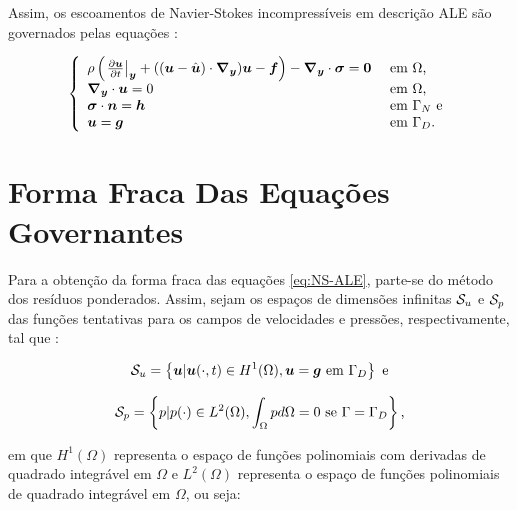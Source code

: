 Assim, os escoamentos de Navier-Stokes incompressíveis em descrição ALE são governados pelas equações \cite{bazilevs2013computational}:

\begin{equation}
    \left\{
    \begin{array}{ll}
        \rho\left({\left.\frac{\partial \boldsymbol{u}}{\partial t}\right|_{\boldsymbol{y}}+((\boldsymbol{u}-\hat{\boldsymbol{u}})\cdot\boldsymbol{\nabla_y})\boldsymbol{u}-\boldsymbol{f}}\right)-\boldsymbol{\nabla_y}\cdot\boldsymbol{\sigma}=\boldsymbol{0} & \text{ em }\Omega\text{,}    \\
        \boldsymbol{\nabla_y}\cdot\boldsymbol{u}=0                                                                         & \text{ em }\Omega\text{,}    \\
        \boldsymbol{\sigma}\cdot\boldsymbol{n}=\boldsymbol{h}                                                                  & \text{ em }\Gamma_N\text{ e} \\
        \boldsymbol{u}=\boldsymbol{g}                                                                            & \text{ em }\Gamma_D\text{.}
    \end{array}
    \right.
    \label{eq:NS-ALE}
\end{equation}

\section{Forma Fraca Das Equações Governantes} \label{FSD}

Para a obtenção da forma fraca das equações \eqref{eq:NS-ALE}, parte-se do método dos resíduos ponderados. Assim, sejam os espaços de dimensões infinitas $\mathcal{S}_u$ e $\mathcal{S}_p$ das funções tentativas para os campos de velocidades e pressões, respectivamente, tal que \cite{bazilevs2013computational,fernandes2020tecnica}:

\begin{equation}
    \mathcal{S}_u=\left\{\boldsymbol{u}|\boldsymbol{u}(\cdot,t)\in H^1(\Omega),\boldsymbol{u}=\boldsymbol{g}\text{ em }\Gamma_D\right\}\text{ e}
\end{equation}

\begin{equation}
    \mathcal{S}_p=\left\{p|p(\cdot)\in L^2(\Omega),\int_\Omega{pd\Omega}=0\text{ se }\Gamma=\Gamma_D\right\}\text{,}
\end{equation}

\noindent em que $H^1(\Omega)$ representa o espaço de funções polinomiais com derivadas de quadrado integrável em $\Omega$ e $L^2(\Omega)$ representa o espaço de funções polinomiais de quadrado integrável em $\Omega$, ou seja:

